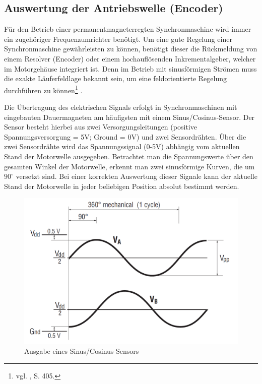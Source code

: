 	
\newpage

\subsection{Auswertung der Antriebswelle (Encoder)}
Für den Betrieb einer permanentmagneterregten Synchronmaschine wird immer ein zugehöriger Frequenzumrichter benötigt. Um eine gute Regelung einer Synchronmaschine gewährleisten zu können, benötigt dieser die Rückmeldung von einem Resolver (Encoder) oder einem hochauflösenden Inkrementalgeber, welcher im Motorgehäuse integriert ist. Denn im Betrieb mit sinusförmigen Strömen muss die exakte Läuferfeldlage bekannt sein, um eine feldorientierte Regelung durchführen zu können\footnote{vgl. \cite{Fischer}, S. 405.} .

Die Übertragung des elektrischen Signals erfolgt in Synchronmaschinen mit eingebauten Dauermagneten am häufigsten mit einem Sinus/Cosinus-Sensor. Der Sensor besteht hierbei aus zwei Versorgungsleitungen (positive Spannungsversorgung = 5V; Ground = 0V) und zwei Sensordrähten. Über die zwei Sensordrähte wird das Spannungssignal (0-5V) abhängig vom aktuellen Stand der Motorwelle ausgegeben. Betrachtet man die Spannungswerte über den gesamten Winkel der Motorwelle, erkennt man zwei sinusförmige Kurven, die um $90^\circ$ versetzt sind. Bei einer korrekten Auswertung dieser Signale kann der aktuelle Stand der Motorwelle in jeder beliebigen Position absolut bestimmt werden.
\\[8mm]
\begin{figure}[H]
	\begin{center}
		\includegraphics[scale=0.3]{figures/antrieb/SinCos_Sensor.png}
		\caption{Ausgabe eines Sinus/Cosinus-Sensors\cite{Manual}}
	\end{center}
\end{figure}



